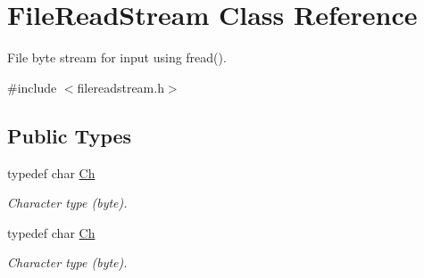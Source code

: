 \hypertarget{classFileReadStream}{}\section{File\+Read\+Stream Class Reference}
\label{classFileReadStream}


File byte stream for input using fread().  




{\ttfamily \#include $<$filereadstream.\+h$>$}

\subsection*{Public Types}
\begin{DoxyCompactItemize}
\item 
\mbox{\label{classFileReadStream_ae1f83d9ca3c76d1d151af0b6c427f046}} 
typedef char \hyperlink{classFileReadStream_ae1f83d9ca3c76d1d151af0b6c427f046}{Ch}
\begin{DoxyCompactList}\small\item\em Character type (byte). \end{DoxyCompactList}\item 
\mbox{\label{classFileReadStream_ae1f83d9ca3c76d1d151af0b6c427f046}} 
typedef char \hyperlink{classFileReadStream_ae1f83d9ca3c76d1d151af0b6c427f046}{Ch}
\begin{DoxyCompactList}\small\item\em Character type (byte). \end{DoxyCompactList}\end{DoxyCompactItemize}
